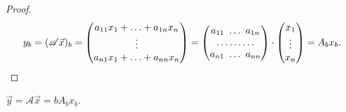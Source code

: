 \begin{proof}
    \begin{equation*}
        y_b = (\mathscr{A}\vec{x})_b = \begin{pmatrix} 
            a_{11}x_1 + \ldots + a_{1n}x_n \\
            \vdots \\
            a_{n1}x_1 + \ldots + a_{nn}x_n
        \end{pmatrix} =
        \begin{pmatrix} 
            a_{11} \thinspace \thinspace \ldots \thinspace \thinspace a_{1n} \\
            \ldots \ldots \ldots \\
            a_{n1} \thinspace \thinspace \ldots \thinspace \thinspace a_{nn}
        \end{pmatrix} \cdot
        \begin{pmatrix} 
            x_1 \\
            \vdots \\
            x_n
        \end{pmatrix} = A_bx_b
    .\end{equation*}
\end{proof}

\begin{corollary}
    $\vec{y} = \mathscr{A}\vec{x} = bA_bx_b.$
\end{corollary}
